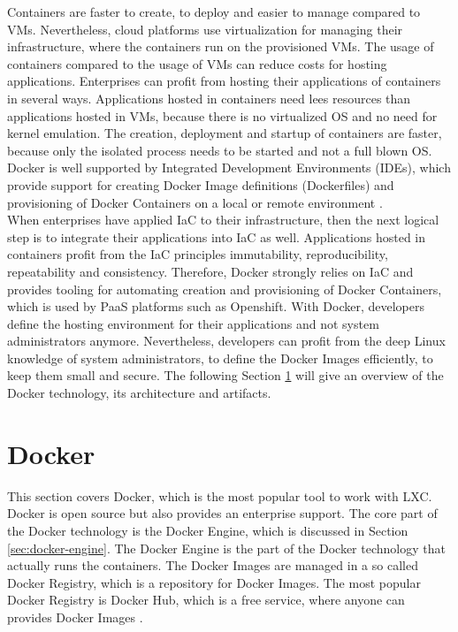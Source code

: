 Containers are faster to create, to deploy and easier to manage compared to VMs. Nevertheless, cloud platforms use virtualization for managing their infrastructure, where the containers run on the provisioned VMs. The usage of containers compared to the usage of VMs can reduce costs for hosting applications. Enterprises can profit from hosting their applications of containers in several ways. Applications hosted in containers need lees resources than applications hosted in VMs, because there is no virtualized OS and no need for kernel emulation. The creation, deployment and startup of containers are faster, because only the isolated process needs to be started and not a full blown OS. Docker is well supported by Integrated Development Environments (IDEs), which provide support for creating Docker Image definitions (Dockerfiles) and provisioning of Docker Containers on a local or remote environment \cite{DockerFile2018}. \\

When enterprises have applied IaC to their infrastructure, then the next logical step is to integrate their applications into IaC as well. Applications hosted in containers profit from the IaC principles immutability, reproducibility, repeatability and consistency. Therefore, Docker strongly relies on IaC and provides tooling for automating creation and provisioning of Docker Containers, which is used by PaaS platforms such as Openshift. With Docker, developers define the hosting environment for their applications and not system administrators anymore. Nevertheless, developers can profit from the deep Linux knowledge of system administrators, to define the Docker Images efficiently, to keep them small and secure. The following Section \ref{sec:docker} will give an overview of the Docker technology, its architecture and artifacts.  

\section{Docker}
\label{sec:docker}
This section covers Docker, which is the most popular tool to work with LXC. Docker is open source but also provides an enterprise support. The core part of the Docker technology is the Docker Engine, which is discussed in Section \ref{sec:docker-engine}. The Docker Engine is the part of the Docker technology that actually runs the containers. The Docker Images are managed in a so called Docker Registry, which is a repository for Docker Images. The most popular Docker Registry is Docker Hub, which is a free service, where anyone can provides Docker Images \cite{DockerRegistry2018}.

